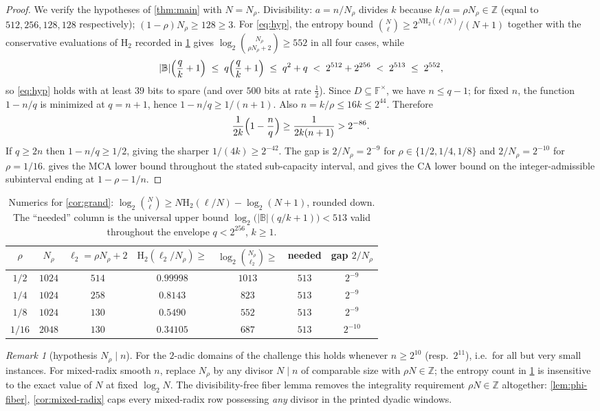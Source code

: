 \documentclass[11pt]{article}
\theoremstyle{definition}
\theoremstyle{remark}
\newtheorem{remark}[remark]{Remark}
\newcommand{\F}{\mathbb{F}}
\newcommand{\B}{\mathbb{B}}
\newcommand{\Hb}{\mathrm{H}_2}
\begin{document}
\begin{proof}
We verify the hypotheses of \cref{thm:main} with $N=N_\rho$. Divisibility: $a=n/N_\rho$ divides $k$ because $k/a=\rho N_\rho\in\mathbb Z$ (equal to $512,256,128,128$ respectively); $(1-\rho)N_\rho\ge128\ge3$. For \eqref{eq:hyp}, the entropy bound $\binom N\ell\ge2^{N\Hb(\ell/N)}/(N+1)$ together with the conservative evaluations of $\Hb$ recorded in \cref{tab:numerics} gives $\log_2\binom{N_\rho}{\rho N_\rho+2}\ge552$ in all four cases, while
\[
|\B|\Bigl(\frac qk+1\Bigr)\;\le\;q\Bigl(\frac qk+1\Bigr)\;\le\;q^2+q\;<\;2^{512}+2^{256}\;<\;2^{513}\;\le\;2^{552},
\]
so \eqref{eq:hyp} holds with at least $39$ bits to spare (and over $500$ bits at rate $\frac12$). Since $D\subseteq\F^\times$, we have $n\le q-1$; for fixed $n$, the function $1-n/q$ is minimized at $q=n+1$, hence $1-n/q\ge1/(n+1)$. Also $n=k/\rho\le16k\le2^{44}$. Therefore
\[
\frac1{2k}\Bigl(1-\frac nq\Bigr)\ge\frac1{2k(n+1)}>2^{-86}.
\]
If $q\ge2n$ then $1-n/q\ge1/2$, giving the sharper $1/(4k)\ge2^{-42}$. The gap is $2/N_\rho=2^{-9}$ for $\rho\in\{1/2,1/4,1/8\}$ and $2/N_\rho=2^{-10}$ for $\rho=1/16$.  gives the MCA lower bound throughout the stated sub-capacity interval, and gives the CA lower bound on the integer-admissible subinterval ending at $1-\rho-1/n$.
\end{proof}

\begin{table}[ht]
\centering
\begin{tabular}{ccccccc}
\toprule
$\rho$ & $N_\rho$ & $\ell_2=\rho N_\rho+2$ & $\Hb(\ell_2/N_\rho)\ge$ & $\log_2\binom{N_\rho}{\ell_2}\ge$ & needed & gap $2/N_\rho$\\
\midrule
$1/2$  & $1024$ & $514$ & $0.99998$ & $1013$ & $513$ & $2^{-9}$\\
$1/4$  & $1024$ & $258$ & $0.8143$  & $823$  & $513$ & $2^{-9}$\\
$1/8$  & $1024$ & $130$ & $0.5490$  & $552$  & $513$ & $2^{-9}$\\
$1/16$ & $2048$ & $130$ & $0.34105$ & $687$  & $513$ & $2^{-10}$\\
\bottomrule
\end{tabular}
\caption{Numerics for \cref{cor:grand}: $\log_2\binom{N}{\ell}\ge N\Hb(\ell/N)-\log_2(N+1)$, rounded down. The ``needed'' column is the universal upper bound $\log_2\bigl(|\B|(q/k+1)\bigr)<513$ valid throughout the envelope $q<2^{256}$, $k\ge1$.}
\label{tab:numerics}
\end{table}

\begin{remark}[hypothesis $N_\rho\mid n$]
For the $2$-adic domains of the challenge this holds whenever $n\ge2^{10}$ (resp.\ $2^{11}$), i.e.\ for all but very small instances. For mixed-radix smooth $n$, replace $N_\rho$ by any divisor $N\mid n$ of comparable size with $\rho N\in\mathbb Z$; the entropy count in \cref{tab:numerics} is insensitive to the exact value of $N$ at fixed $\log_2 N$. The divisibility-free fiber lemma removes the integrality requirement $\rho N\in\mathbb Z$ altogether: \cref{lem:phi-fiber}, \cref{cor:mixed-radix} caps every mixed-radix row possessing \emph{any} divisor in the printed dyadic windows.
\end{remark}
\end{document}
